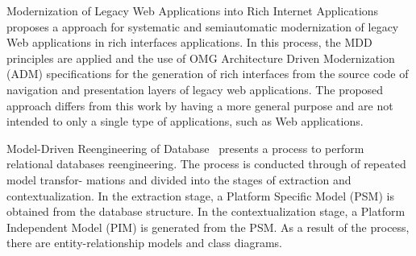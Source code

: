  Modernization of Legacy Web Applications into Rich Internet Applications~\cite{Rodriguez-Echeverria:2011:MLW:2186508.2186536} proposes a approach for systematic and semiautomatic modernization of legacy Web applications in rich interfaces applications. In this process, the MDD principles are applied and the use of OMG Architecture Driven Modernization (ADM) specifications for the generation of rich interfaces from the source code of navigation and presentation layers of legacy web applications. The proposed approach differs from this work by having a more general purpose and are not intended to only a single type of applications, such as Web applications.


Model-Driven Reengineering of Database~\cite{Wang:2009:MRD:1685997.1686596} presents a process to perform relational databases reengineering. The process is conducted through of repeated model transfor- mations and divided into the stages of extraction and contextualization. In the extraction stage, a Platform Specific Model (PSM) is obtained from the database structure. In the contextualization stage, a Platform Independent Model (PIM) is generated from the PSM. As a result of the process, there are entity-relationship models and class diagrams.
